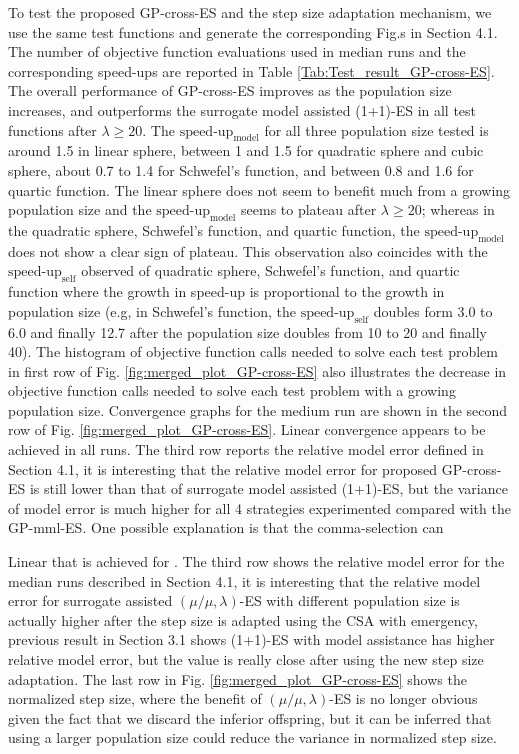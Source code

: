To test the proposed GP-cross-ES and the step size adaptation mechanism, we use the same test functions and generate the corresponding Fig.s in Section 4.1. The number of objective function evaluations used in median runs and the corresponding speed-ups are reported in Table \ref{Tab:Test_result_GP-cross-ES}. The overall performance of GP-cross-ES improves as the population size increases, and outperforms the surrogate model assisted (1+1)-ES \cite{DBLP:conf/ppsn/KayhaniA18} in all test functions after $\lambda\geq 20$. The $\text{speed-up}_{\text{model}}$ for all three population size tested is around 1.5 in linear sphere, between 1 and 1.5 for quadratic sphere and cubic sphere, about 0.7 to 1.4 for Schwefel's function, and between 0.8 and 1.6 for quartic function. The linear sphere does not seem to benefit much from a growing population size and the $\text{speed-up}_{\text{model}}$ seems to plateau after $\lambda \geq 20$; whereas in the quadratic sphere, Schwefel's function, and quartic function, the $\text{speed-up}_{\text{model}}$ does not show a clear sign of plateau. This observation also coincides with the $\text{speed-up}_{\text{self}}$ observed of quadratic sphere, Schwefel's function, and quartic function where the growth in speed-up is proportional to the growth in population size (e.g, in Schwefel’s function, the $\text{speed-up}_{\text{self}}$ doubles form 3.0 to 6.0 and finally 12.7 after the population size doubles from 10 to 20 and finally 40). The histogram of objective function calls needed to solve each test problem in first row of Fig. \ref{fig:merged_plot_GP-cross-ES} also illustrates the decrease in objective function calls needed to solve each test problem with a growing population size. Convergence graphs for the medium run are shown in the second row of Fig. \ref{fig:merged_plot_GP-cross-ES}. Linear convergence appears to be achieved in all runs. The third row reports the relative model error defined in Section 4.1, it is interesting that the relative model error for proposed GP-cross-ES is still lower than that of surrogate model assisted (1+1)-ES, but the variance of model error is much higher for all 4 strategies experimented compared with the GP-mml-ES. One possible explanation is that the comma-selection can 

Linear  that  is achieved for . The third row shows the relative model error for the median runs described in Section 4.1, it is interesting that the relative model error for surrogate assisted $(\mu/\mu,\lambda)$-ES with different population size is actually higher after the step size is adapted using the CSA with emergency, previous result in Section 3.1 shows (1+1)-ES with model assistance has higher relative model error, but the value is really close after using the new step size adaptation. The last row in Fig. \ref{fig:merged_plot_GP-cross-ES} shows the normalized step size, where the benefit of $(\mu/\mu,\lambda)$-ES is no longer obvious given the fact that we discard the inferior offspring, but it can be inferred that using a larger population size could reduce the variance in normalized step size.


